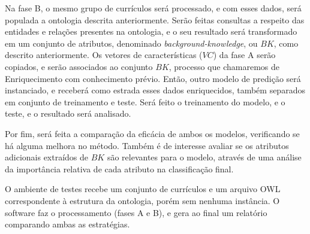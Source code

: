 Na fase B, o mesmo grupo de currículos será processado, e com esses dados, será populada a ontologia descrita anteriormente. Serão feitas consultas a respeito das entidades e relações presentes na ontologia, e o seu resultado será transformado em um conjunto de atributos, denominado \textit{background-knowledge}, ou $BK$, como descrito anteriormente. Os vetores de características ($VC$) da fase A serão copiados, e serão associados ao conjunto $BK$, processo que chamaremos de Enriquecimento com conhecimento prévio. Então, outro modelo de predição será instanciado, e receberá como estrada esses dados enriquecidos, também separados em conjunto de treinamento e teste. Será feito o treinamento do modelo, e o teste, e o resultado será analisado.

Por fim, será feita a comparação da eficácia de ambos os modelos, verificando se há alguma melhora no método. Também é de interesse avaliar se os atributos adicionais extraídos de $BK$ são relevantes para o modelo, através de uma análise da importância relativa de cada atributo na classificação final.

O ambiente de testes recebe um conjunto de currículos e um arquivo OWL correspondente à estrutura da ontologia, porém sem nenhuma instância. O software faz o processamento (fases A e B), e gera ao final um relatório comparando ambas as estratégias.

